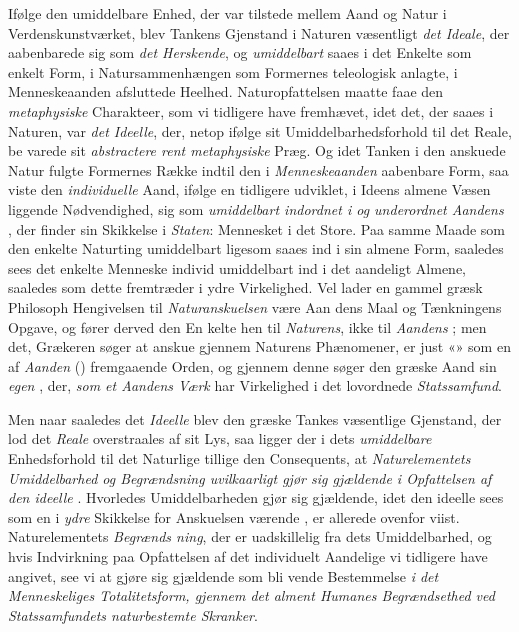 Ifølge den umiddelbare Enhed, der var tilstede mellem
Aand og Natur i Verdenskunstværket, blev Tankens Gjenstand
i Naturen væsentligt \emph{det Ideale}, der aabenbarede sig som
\emph{det Herskende}, og \emph{umiddelbart} saaes i det Enkelte som
enkelt Form, i Natursammenhængen som Formernes teleologisk
anlagte, i Menneskeaanden afsluttede Heelhed. Naturopfattelsen
maatte faae den \emph{metaphysiske} Charakteer, som vi tidligere
have fremhævet, idet det, der saaes i Naturen, var \emph{det Ideelle},
der, netop ifølge sit Umiddelbarhedsforhold til det Reale, be\-%
varede sit \emph{abstractere rent metaphysiske} Præg. Og
idet Tanken i den anskuede Natur fulgte Formernes Række
indtil den i \emph{Menneskeaanden} aabenbare Form, saa viste
den \emph{individuelle} Aand, ifølge en tidligere udviklet, i Ideens
almene Væsen liggende Nødvendighed, sig som \emph{umiddelbart
indordnet i og underordnet Aandens }, der finder
sin Skikkelse i \emph{Staten}: Mennesket i det Store. Paa samme
Maade som den enkelte Naturting umiddelbart ligesom saaes
ind i sin almene Form, saaledes sees det enkelte Menneske\-%
individ umiddelbart ind i det aandeligt Almene, saaledes som
dette fremtræder i ydre Virkelighed. Vel lader en gammel
græsk Philosoph Hengivelsen til \emph{Naturanskuelsen} være Aan\-%
dens Maal og Tænkningens Opgave, og fører derved den En\-%
kelte hen til \emph{Naturens}, ikke til \emph{Aandens} ; men
det, Grækeren søger at anskue gjennem Naturens Phænomener,
er just «» som en af \emph{Aanden}
() fremgaaende Orden, og gjennem denne søger den
græske Aand sin \emph{egen} , der, \emph{som et Aandens Værk}
har Virkelighed i det lovordnede \emph{Statssamfund}.

Men naar saaledes det \emph{Ideelle} blev den græske Tankes
væsentlige Gjenstand, der lod det \emph{Reale} overstraales af sit
Lys, saa ligger der i dets \emph{umiddelbare} Enhedsforhold til
det Naturlige tillige den Consequents, at \emph{Naturelementets}
\emph{Umiddelbarhed og Begrændsning uvilkaarligt gjør
sig gjældende i Opfattelsen af den ideelle }.
Hvorledes Umiddelbarheden gjør sig gjældende, idet den ideelle
 sees som en i \emph{ydre} Skikkelse for Anskuelsen værende
, er allerede ovenfor viist. Naturelementets \emph{Begrænds\-%
ning}, der er uadskillelig fra dets Umiddelbarhed, og hvis
Indvirkning paa Opfattelsen af det individuelt Aandelige vi
tidligere have angivet, see vi at gjøre sig gjældende som bli\-%
vende Bestemmelse \emph{i det Menneskeliges Totalitetsform,
gjennem det alment Humanes Begrændsethed ved
Statssamfundets naturbestemte Skranker}.

